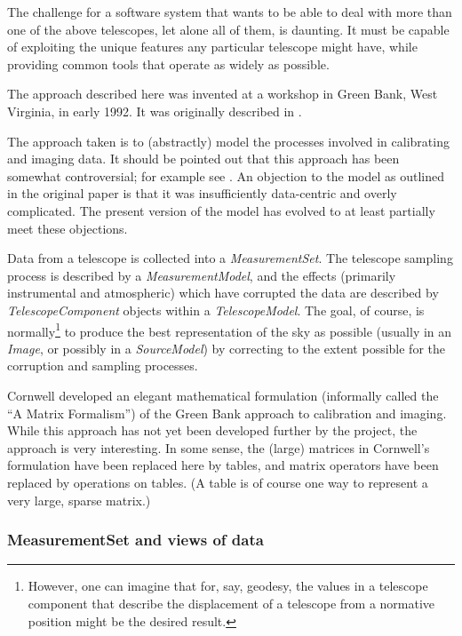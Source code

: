The challenge for a software system that wants to be able to deal with
more than one of the above telescopes, let alone all of them, is
daunting. It must be capable of exploiting the unique features any
particular telescope might have, while providing common tools that
operate as widely as possible.

The approach described here was invented at a workshop in Green Bank,
West Virginia, in early 1992. It was originally described in
\cite{shone:gb}.

The approach taken is to (abstractly) model the processes involved in
calibrating and imaging data. It should be pointed out that this
approach has been somewhat controversial; for example see
\cite{flatters:rational}. An objection to the model as outlined in the
original paper is that it was insufficiently data-centric and overly
complicated. The present version of the model has evolved to at least
partially meet these objections.

Data from a telescope is collected into a {\em MeasurementSet}. The
telescope sampling process is described by a {\em MeasurementModel},
and the effects (primarily instrumental and atmospheric) which have
corrupted the data are described by {\em TelescopeComponent} objects
within a {\em TelescopeModel}. The goal, of course, is
normally\footnote{However, one can imagine that for, say, geodesy, the
values in a telescope component that describe the displacement of a
telescope from a normative position might be the desired result.} to
produce the best representation of the sky as possible (usually in an
{\em Image}, or possibly in a {\em SourceModel}) by correcting to the
extent possible for the corruption and sampling processes.

Cornwell \cite{cornwell:imaging,cornwell:telescope} developed an
elegant mathematical formulation (informally called the ``A Matrix
Formalism'') of the Green Bank approach to calibration and
imaging. While this approach has not yet been developed further by the
project, the approach is very interesting. In some sense, the (large)
matrices in Cornwell's formulation have been replaced here by tables,
and matrix operators have been replaced by operations on tables. (A
table is of course one way to represent a very large, sparse matrix.)

\subsubsection{MeasurementSet and views of data}
\label{sec:MS}

